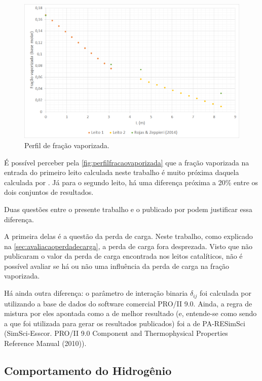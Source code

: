 \begin{figure}[htb]
\centering \includegraphics[scale=0.4]{images/Chap4/perfilfracaovaporizada.png}
\caption{Perfil de fração vaporizada.}
\label{fig:perfilfracaovaporizada}
\end{figure}

É possível perceber pela \autoref{fig:perfilfracaovaporizada} que a fração
vaporizada na entrada do primeiro leito calculada neste trabalho é muito próxima
daquela calculada por . Já para o segundo leito, há uma
diferença próxima a 20\% entre os dois conjuntos de resultados.

Duas questões entre o presente trabalho e o publicado por
 podem justificar essa diferença.

A primeira delas é a questão da perda de carga. Neste trabalho, como explicado
na \autoref{sec:avaliacaoperdadecarga}, a perda de carga fora desprezada. Visto
que  não publicaram o valor da perda de carga encontrada nos
leitos catalíticos, não é possível avaliar se há ou não uma influência da perda
de carga na fração vaporizada.

Há ainda outra diferença: o parâmetro de interação binaria $\delta_{ij}$ foi
calculada por  utilizando a base de dados do software
comercial PRO/II 9.0. Ainda, a regra de mistura por eles apontada como a de
melhor resultado (e, entende-se como sendo a que foi utilizada para gerar os
resultados publicados) foi a de PA-RESimSci (SimSci-Esscor. PRO/II 9.0 Component
and Thermophysical Properties Reference Manual (2010)).

\subsection{Comportamento do Hidrogênio} \label{comportamentodohidrogenio}

